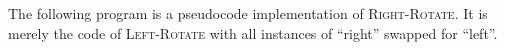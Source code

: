 The following program is a pseudocode implementation of \textsc{Right-Rotate}. It is merely the code of \textsc{Left-Rotate} with all instances of ``right'' swapped for ``left''.
